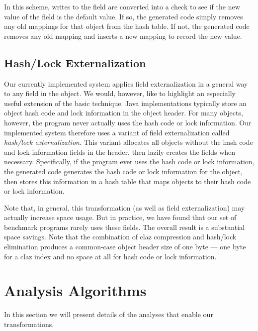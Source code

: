 \documentclass{acmconf}
\begin{document}
In this scheme, writes to the field are converted into a check to see
if the new value of the field is the default value. If so, the 
generated code simply removes any old mappings for that 
object from the hash table.
If not, the generated code removes any old mapping and inserts a new
mapping to record the new value. 

\subsection{Hash/Lock Externalization}

Our currently implemented system applies field externalization
in a general way to any field in the object. We would, however,
like to highlight an especially useful extension of the basic
technique. Java implementations typically store an object
hash code and lock information in the object header. For many
objects, however, the program never actually uses the hash code
or lock information. Our implemented system therefore uses
a variant of field externalization called {\em hash/lock 
externalization}. This variant allocates all objects 
without the hash code and lock information fields in the header,
then lazily creates the fields when necessary. 
Specifically, if the program ever uses the hash code or lock information, 
the generated code generates the hash code or lock information
for the object, then stores this information in a hash table
that maps objects to their hash code or lock information. 

Note that, in general, this transformation (as well as field
externalization) may actually increase space usage. But in
practice, we have found that our set of benchmark programs
rarely uses these fields. The overall result is a substantial
space savings. Note that the combination of claz compression 
and hash/lock elimination produces a common-case object header
size of one byte --- one byte for a claz index and no
space at all for hash code or lock information. 

\section{Analysis Algorithms}

In this section we will present details of the analyses that enable
our transformations.
\end{document}

